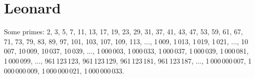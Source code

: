 
\chapter{Leonard}


Some primes: 2, 3, 5, 7, 11, 13, 17, 19, 23, 29, 31, 37, 41, 43, 47, 53, 59, 61, 67, 71, 73, 79, 83, 89, 97, 101, 103, 107, 109, 113, ..., 1\,009, 1\,013,  1\,019, 1\,021, ..., 10\,007, 10\,009, 10\,037, 10\,039, ..., 1\,000\,003, 1\,000\,033, 1\,000\,037, 1\,000\,039, 1\,000\,081, 1\,000\,099, ..., 961\,123\,123, 961\,123\,129, 961\,123\,181, 961\,123\,187, ..., 1\,000\,000\,007, 1\,000\,000\,009, 1\,000\,000\,021, 1\,000\,000\,033.

